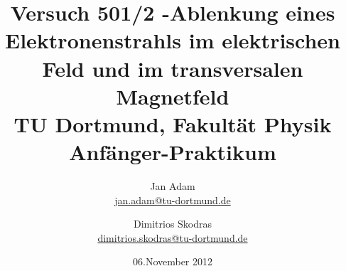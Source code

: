 



\title{Versuch 501/2 -Ablenkung eines Elektronenstrahls im elektrischen Feld und im transversalen Magnetfeld\\				%
\large TU Dortmund, Fakultät Physik\\ 
\normalsize Anfänger-Praktikum}

\author{Jan Adam\\			%
{\small \href{jan.adam@tu-dortmund.de}{jan.adam@tu-dortmund.de}}	%
\and						%
Dimitrios Skodras\\					%
{\small \href{dimitrios.skodras@tu-dortmund.de}{dimitrios.skodras@tu-dortmund.de}}		%
}
\date{06.November 2012}				%





\maketitle					%
\thispagestyle{empty} 				%



\tableofcontents


\newpage					%


